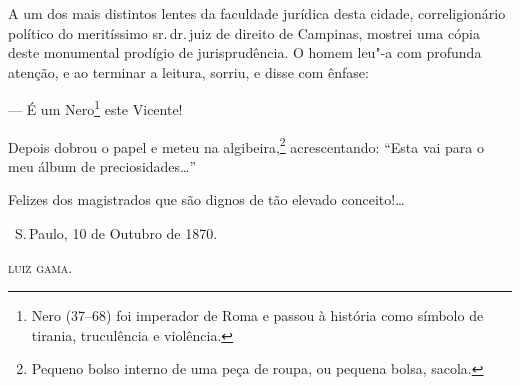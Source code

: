 A um dos mais distintos lentes da faculdade jurídica desta cidade,
correligionário político do meritíssimo sr.\,dr.\,juiz de direito de
Campinas, mostrei uma cópia deste monumental prodígio de jurisprudência.
O homem leu"-a com profunda atenção, e ao terminar a leitura, sorriu, e
disse com ênfase:

--- É um Nero\footnote{Nero (37--68) foi imperador de Roma e passou à
  história como símbolo de tirania, truculência e violência.} este
Vicente!

Depois dobrou o papel e meteu na algibeira,\footnote{Pequeno bolso
  interno de uma peça de roupa, ou pequena bolsa, sacola.}
acrescentando: ``Esta vai
para o meu álbum de preciosidades\ldots{}''

Felizes dos magistrados que são dignos de tão elevado conceito!\ldots{}

\bigskip

\hfill\ S.\,Paulo, 10 de Outubro de 1870.\smallskip

\hfill\textsc{luiz gama.}

\paginabranca
\mbox{}\vfill
\thispagestyle{empty}

